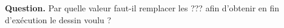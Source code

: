 \documentclass[class=report,crop=false, 12pt]{standalone}
\begin{document}
\begin{enigme}
\begin{minipage}{0.49\textwidth}
\begin{center}
\begin{scratch}
\end{scratch}
\end{center} 
\end{minipage}



\bigskip

\textbf{Question.} Par quelle valeur faut-il remplacer les \og{}???\fg{} afin d'obtenir en fin d'exécution le dessin voulu ?


\end{enigme}

\bigskip
\end{document}
